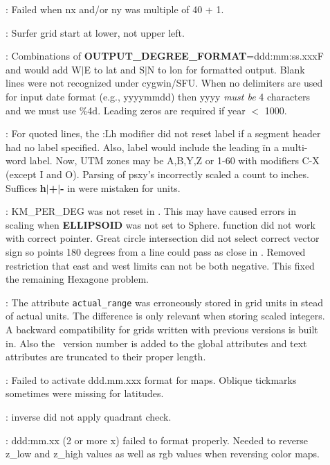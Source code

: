 \begin{description}
\item []: Failed when nx and/or ny was multiple of 40 + 1.
\item []: Surfer grid start at lower, not upper left.
\item []: Combinations of \textbf{OUTPUT\_DEGREE\_FORMAT}=ddd:mm:ss.xxxF and \Opt{:}
would add W$|$E to lat and S$|$N to lon for formatted output.
Blank lines were not recognized under cygwin/SFU.
When no delimiters are used for input date format (e.g., yyyymmdd) then yyyy \emph{must be} 4 characters
and we must use \%4d.  Leading zeros are required if year $<$ 1000.
\item []: For quoted lines, the :Lh modifier did not reset label if
a segment header had no label specified.  Also, label would include the leading \" in a multi-word label.
Now, UTM zones may be A,B,Y,Z or 1-60 with modifiers C-X (except I and O).
Parsing of psxy's  incorrectly scaled a count to inches.
Suffices \textbf{h$|$+$|$-} in  were mistaken for units.
\item []: KM\_PER\_DEG was not reset in . This may have caused
errors in scaling when \textbf{ELLIPSOID} was not set to Sphere.   function did not work with correct pointer.
Great circle intersection did not select correct vector sign so
points 180 degrees from a line could pass as close in .
Removed restriction that east and west limits can not be
both negative. This fixed the remaining Hexagone problem.
\item []: The attribute \texttt{actual\_range} was erroneously stored in grid units
in stead of actual units. The difference is only relevant when storing scaled integers. A backward
compatibility for grids written with previous versions is built in. Also the \GMT\ version number is added
to the global attributes and text attributes are truncated to their proper length.
\item []: Failed to activate ddd.mm.xxx format for maps.  Oblique tickmarks sometimes
were missing for latitudes.
\item []:  inverse did not apply quadrant check.
\item []: ddd:mm.xx (2 or more x) failed to format properly.  Needed to reverse z\_low
and z\_high values as well as rgb values when reversing color maps.

\end{description}
